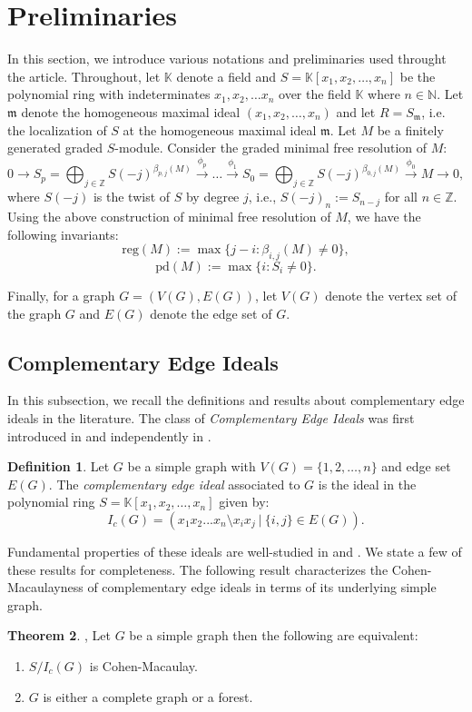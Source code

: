 \documentclass[oneside, 12pt]{amsart} \topmargin      -10mm \textwidth      160 true mm
\theoremstyle{definition}
\newtheorem{theorem'}{Theorem}[subsection]
\newtheorem{definition'}[theorem']{Definition}
\numberwithin{equation}{section}
\begin{document}
\section{Preliminaries}\label{S2}
In this section, we introduce various notations and preliminaries used throught the article.
Throughout, let $\mathbb{K}$ denote a field and $S=\mathbb{K}[x_{1},x_{2},\dots,x_{n}]$ be the polynomial ring with indeterminates $x_{1},x_{2},\dots x_{n}$ over the field $\mathbb{K}$  where $n \in \mathbb{N}$. Let $\mathfrak{m}$ denote the homogeneous maximal ideal $(x_1,x_2,\dots,x_n)$ and let $R=S_\mathfrak{m}$, i.e. the localization of $S$ at the homogeneous maximal ideal $\mathfrak{m}$.  Let $ M $ be a finitely generated graded $ S $-module. Consider the graded minimal free resolution of $ M $: 
$$ 0 \to S_p=\bigoplus_{j\in\mathbb{Z}}S(-j)^{\beta_{p, j}(M)}\xrightarrow{\phi_p}\dots \xrightarrow{\phi_1}S_0=\bigoplus_{j\in\mathbb{Z}}S(-j)^{\beta_{0, j}(M)} \xrightarrow{\phi_0} M \to {0}, $$
where $ S(-j) $ is the twist of $ S $ by degree $ j $, i.e., $ S(-j)_n:=S_{n-j} $ for all $ n\in\mathbb{Z} $. Using the above construction of minimal free resolution of $M$, we have the following invariants:
$$ \mathrm{reg}(M):=\max\{j-i:\beta_{i,j}(M) \neq 0\},$$
$$ \mathrm{pd}(M):=\max\{i:S_i\neq 0\}. $$

\noindent Finally, for a graph $G=(V(G),E(G))$, let $V(G)$ denote the vertex set of the graph $G$ and $E(G)$ denote the edge set of $G$. 
\subsection{Complementary Edge Ideals}\label{S2.1} In this subsection, we recall the definitions and results about complementary edge ideals in the literature. The class of \textit{Complementary Edge Ideals} was first introduced in \cite{hibi2025complementary} and independently in \cite{ficarra2025complementary}. 
\begin{definition'}
    Let $G$ be a simple graph with $V(G)=\{1,2,\dots,n\}$ and edge set $E(G)$. The \textit{complementary edge ideal} associated to $G$ is the ideal in the polynomial ring $S=\mathbb{K}[x_{1},x_{2},\dots,x_{n}]$ given by:
    $$I_c(G)= (x_1x_2...x_n\setminus x_ix_j\ |\  \{i,j\} \in E(G) ).$$
\end{definition'}
\noindent Fundamental properties of these ideals are well-studied in \cite{ficarra2025complementary} and \cite{hibi2025complementary}. We state a few of these results for completeness. The following result characterizes the Cohen-Macaulayness of complementary edge ideals in terms of its underlying simple graph. 
\begin{theorem'}\cite[Theorem~2.8.]{ficarra2025complementary}, \cite[Theorem~1.4.]{hibi2025complementary} \label{CM} Let $G$ be a simple graph then the following are equivalent:
\begin{enumerate}
    \item $S/I_c(G)$ is Cohen-Macaulay.
    \item $G$ is either a complete graph or a forest.
\end{enumerate}
\end{theorem'}
\end{document}
